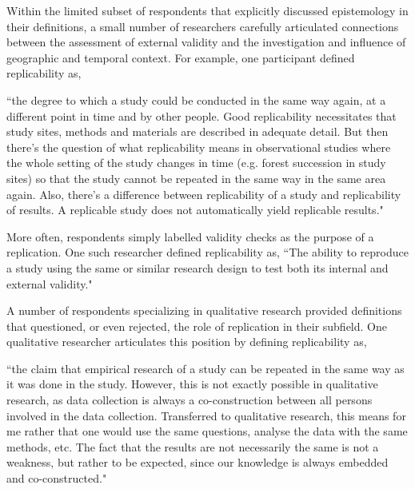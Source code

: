 \documentclass[]{interact}
\theoremstyle{plain}%
\theoremstyle{definition}
\theoremstyle{remark}
\begin{document}
Within the limited subset of respondents that explicitly discussed epistemology in their definitions, a small number of researchers carefully articulated connections between the assessment of external validity and the investigation and influence of geographic and temporal context. For example, one participant defined replicability as, 

\begin{displayquote}
``the degree to which a study could be conducted in the same way again, at a different point in time and by other people. Good replicability necessitates that study sites, methods and materials are described in adequate detail. But then there's the question of what replicability means in observational studies where the whole setting of the study changes in time (e.g. forest succession in study sites) so that the study cannot be repeated in the same way in the same area again. Also, there's a difference between replicability of a study and replicability of results. A replicable study does not automatically yield replicable results."
\end{displayquote}

\noindent More often, respondents simply labelled validity checks as the purpose of a replication. One such researcher defined replicability as, ``The ability to reproduce a study using the same or similar research design to test both its internal and external validity." 

A number of respondents specializing in qualitative research provided definitions that questioned, or even rejected, the role of replication in their subfield. 
One qualitative researcher articulates this position by defining replicability as, 

\begin{displayquote}
    ``the claim that empirical research of a study can be repeated in the same way as it was done in the study. However, this is not exactly possible in qualitative research, as data collection is always a co-construction between all persons involved in the data collection. Transferred to qualitative research, this means for me rather that one would use the same questions, analyse the data with the same methods, etc. The fact that the results are not necessarily the same is not a weakness, but rather to be expected, since our knowledge is always embedded and co-constructed." 
\end{displayquote}
\end{document}
